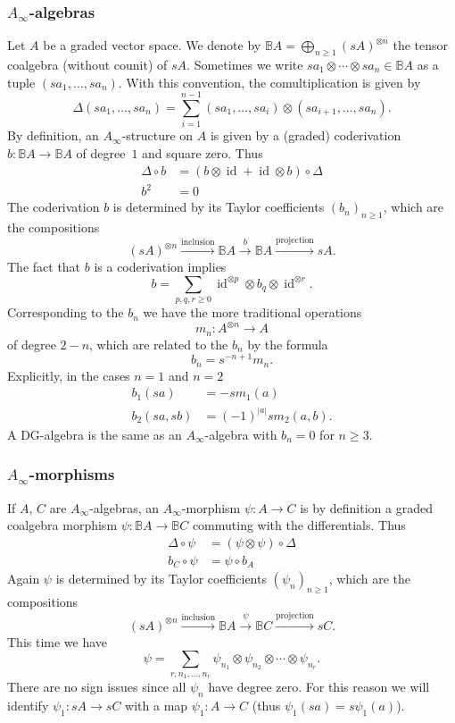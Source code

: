 \documentclass{amsart}
\numberwithin{equation}{section}
\theoremstyle{definition}
\theoremstyle{remark}
\begin{document}
\subsubsection{$A_\infty$-algebras}
Let $A$ be a graded vector space. We denote by ${\mathbb{B}} A=\bigoplus_{n\ge 1} (sA)^{\otimes n}$ 
the tensor coalgebra   (without counit) of $s A$. 
Sometimes we write $sa_1\otimes\cdots \otimes sa_n\in {\mathbb{B}} A$
as a tuple $(sa_1,\ldots,sa_n)$. With this convention, the comultiplication is
given by
\[
\Delta(sa_1,\ldots,s a_n)=\sum_{i=1}^{n-1} (sa_1,\ldots,sa_i)\otimes (sa_{i+1},\ldots,sa_n).
\]
By definition, an $A_\infty$-structure on $A$ is given by a (graded) coderivation
$b:{\mathbb{B}} A{\rightarrow} {\mathbb{B}} A$ of degree~$1$ and square zero. Thus
\begin{align*}
\Delta\circ b&=(b\otimes {\operatorname{id}}+{\operatorname{id}}\otimes b)\circ \Delta\\
b^2&=0
\end{align*}
The coderivation $b$ is determined by its Taylor coefficients  $(b_n)_{n\ge 1}$, 
which are the compositions
\[
(s A)^{\otimes n}\xrightarrow{\text{inclusion}} {\mathbb{B}} A\xrightarrow{b} {\mathbb{B}} A\xrightarrow{\text{projection}} s A.
\]
The fact that $b$ is a coderivation implies 
\[
b=\sum_{p,q,r\geq 0} {\operatorname{id}}^{\otimes p} \otimes b_q\otimes {\operatorname{id}}^{\otimes r}.
\]
Corresponding to the $b_n$ we have
the more traditional operations 
\[
m_n:A^{\otimes n}{\rightarrow} A
\]
of degree $2-n$,
which are related to the $b_n$ by the formula
\[
b_n=s^{-n+1}m_n.
\]
Explicitly, in the cases $n=1$ and $n=2$
\begin{equation}
\label{ref-9.1-51}
\begin{aligned}
b_1(sa)&=-sm_1(a)\\
b_2(sa,sb)&=(-1)^{|a|}sm_2(a,b).
\end{aligned}
\end{equation}
A DG-algebra is the same as an $A_\infty$-algebra with $b_n=0$ for $n\ge 3$.
\subsubsection{$A_\infty$-morphisms}
If $A$, $C$ are $A_\infty$-algebras, an $A_\infty$-morphism $\psi:A{\rightarrow} C$ is by definition
a graded coalgebra morphism $\psi:{\mathbb{B}} A{\rightarrow} {\mathbb{B}} C$ commuting with the differentials. Thus
\begin{align*}
\Delta\circ \psi&=(\psi\otimes \psi)\circ \Delta\\
b_C\circ \psi&=\psi \circ b_A
\end{align*}
 Again $\psi$ is
determined by its Taylor coefficients $(\psi_n)_{n\ge 1}$, which are the compositions
\[
(s A)^{\otimes n}\xrightarrow{\text{inclusion}} {\mathbb{B}} A\xrightarrow{\psi} {\mathbb{B}} C\xrightarrow{\text{projection}} s C.
\]
This time we have
\[
\psi=\sum_{r,n_1,\ldots,n_r} \psi_{n_1}\otimes \psi_{n_2} \otimes \cdots \otimes \psi_{n_r}.
\]
There are no sign issues since all $\psi_n$ have degree zero. For this reason we will identify $\psi_1:sA{\rightarrow} sC$
with a map $\psi_1:A{\rightarrow} C$ (thus $\psi_1(sa)=s\psi_1(a)$).
\end{document}
